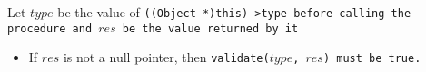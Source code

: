 Let $type$ be the value of \tt{((Object *)this)->type} before
calling the procedure and $res$ be the value returned by it

\begin{itemize}

\item If $res$ is not a null pointer, then
\tt{validate(}$type$\tt{,} $res$\tt{)} must be \tt{true}.

\end{itemize}
